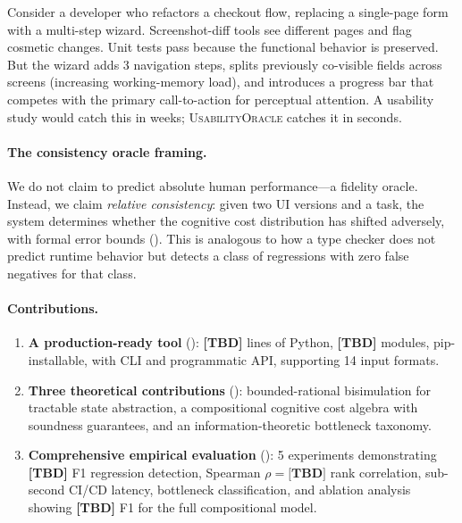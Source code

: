 \documentclass[11pt,twocolumn]{article}
\theoremstyle{definition}
\newcommand{\tool}{\textsc{UsabilityOracle}}
\begin{document}
Consider a developer who refactors a checkout flow, replacing a single-page form with a multi-step wizard.
Screenshot-diff tools see different pages and flag cosmetic changes.
Unit tests pass because the functional behavior is preserved.
But the wizard adds 3 navigation steps, splits previously co-visible fields across screens (increasing working-memory load), and introduces a progress bar that competes with the primary call-to-action for perceptual attention.
A usability study would catch this in weeks; \tool{} catches it in seconds.

\paragraph{The consistency oracle framing.}
We do not claim to predict absolute human performance---a fidelity oracle.
Instead, we claim \emph{relative consistency}: given two UI versions and a task, the system determines whether the cognitive cost distribution has shifted adversely, with formal error bounds ().
This is analogous to how a type checker does not predict runtime behavior but detects a class of regressions with zero false negatives for that class.

\paragraph{Contributions.}
\begin{enumerate}[leftmargin=*,nosep]
  \item \textbf{A production-ready tool} (): \textbf{[TBD]} lines of Python, \textbf{[TBD]} modules, pip-installable, with CLI and programmatic API, supporting 14 input formats.
  \item \textbf{Three theoretical contributions} (): bounded-rational bisimulation for tractable state abstraction, a compositional cognitive cost algebra with soundness guarantees, and an information-theoretic bottleneck taxonomy.
  \item \textbf{Comprehensive empirical evaluation} (): 5 experiments demonstrating \textbf{[TBD]} F1 regression detection, Spearman $\rho = \textbf{[TBD]}$ rank correlation, sub-second CI/CD latency, bottleneck classification, and ablation analysis showing \textbf{[TBD]} F1 for the full compositional model.
\end{enumerate}

\end{document}
